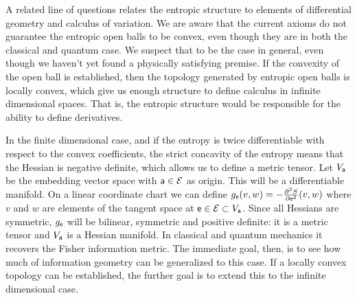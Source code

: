 A related line of questions relates the entropic structure to elements of differential geometry and calculus of variation. We are aware that the current axioms do not guarantee the entropic open balls to be convex, even though they are in both the classical and quantum case. We suspect that to be the case in general, even though we haven't yet found a physically satisfying premise. If the convexity of the open ball is established, then the topology generated by entropic open balls is locally convex, which give us enough structure to define calculus in infinite dimensional spaces. That is, the entropic structure would be responsible for the ability to define derivatives.

In the finite dimensional case, and if the entropy is twice differentiable with respect to the convex coefficients, the strict concavity of the entropy means that the Hessian is negative definite, which allows us to define a metric tensor. Let $V_{\ens[a]}$ be the embedding vector space with $\ens[a] \in \Ens$ as origin. This will be a differentiable manifold. On a linear coordinate chart we can define $g_{\ens}( v, w ) = - \frac{\partial^2 S}{\partial \ens ^2}( v, w )$ where $v$ and $w$ are elements of the tangent space at $\ens \in \Ens \subset V_{\ens[a]}$. Since all Hessians are symmetric, $g_{\ens}$ will be bilinear, symmetric and positive definite: it is a metric tensor and $V_{\ens[a]}$ is a Hessian manifold. In classical and quantum mechanics it recovers the Fisher information metric. The immediate goal, then, is to see how much of information geometry can be generalized to this case. If a locally convex topology can be established, the further goal is to extend this to the infinite dimensional case.

